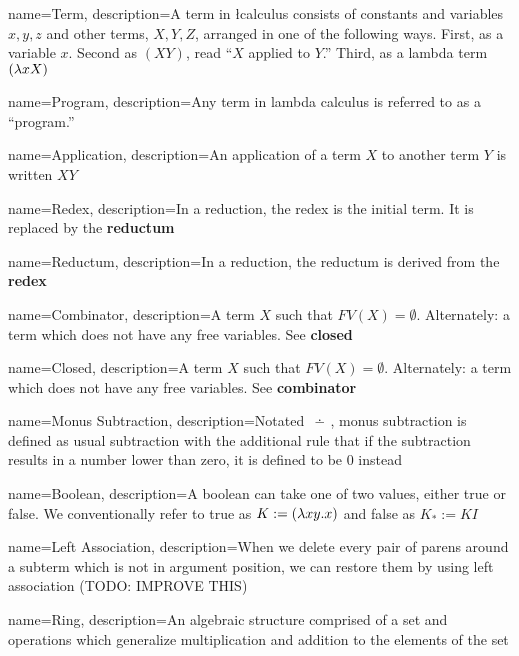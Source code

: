 {
        name=Term,
        description={A term in \l calculus consists of constants and variables $x, y, z$ and other terms, $X, Y, Z$, arranged in one of the following ways. First, as a variable $x$. Second as $(XY)$, read ``$X$ applied to $Y$.'' Third, as a lambda term $(\lambda xX)$}
}

{
        name=Program,
        description={Any term in lambda calculus is referred to as a ``program.''}
}

{
        name=Application,
        description={An application of a term $X$ to another term $Y$ is written $XY$}
}

{
        name=Redex,
        description={In a reduction, the redex is the initial term. It is replaced by the \textbf{reductum}}
}

{
        name=Reductum,
        description={In a reduction, the reductum is derived from the \textbf{redex}}
}

{
        name=Combinator,
        description={A term $X$ such that $FV(X) = \emptyset$. Alternately: a term which does not have any free variables. See \textbf{closed}}
}

{
        name=Closed,
        description={A term $X$ such that $FV(X) = \emptyset$. Alternately: a term which does not have any free variables. See \textbf{combinator}}
}

{
        name={Monus Subtraction},
        description={Notated $\dotdiv$, monus subtraction is defined as usual subtraction with the additional rule that if the subtraction results in a number lower than zero, it is defined to be $0$ instead}
}

{
        name={Boolean},
        description={A boolean can take one of two values, either true or false. We conventionally refer to true as $K := (\lambda xy.x)$ and false as $K_* := KI$}
}

{
        name={Left Association},
        description={When we delete every pair of parens around a subterm which is not in argument position, we can restore them by using left association (TODO: IMPROVE THIS)}
}

{
        name={Ring},
        description={An algebraic structure comprised of a set and operations which generalize multiplication and addition to the elements of the set}
}

